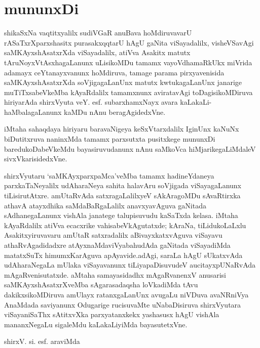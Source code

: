 \chapter*{mununxDi}
\vskip -20pt


shikaSxNa vaqtitxyalilx sudiVGaR anuBava hoMdiruvavarU rASaTxrXparxshasitx purasakxqqtarU hAgU gaNita viSayadalilx, visheVSavAgi saMKAyxshAsatxrXda viSayadalilx, atiVva Asakitx matutx tAruNoyxVtAsxhagaLanunx uLisikoMDu tamamx vayoVdhamaRkUkx  miVrida adamayx ceYtanayxvanunx hoMdiruva, tamage parama pirxyavenisida saMKAyxshAsatxrXda soVjigagaLanUnx matutx  kwtukagaLanUnx janarige muTiTxsabeVkeMba  kAyaRdalilx tamamxnunx aviratavAgi toDagisikoMDiruva hiriyarAda shirxVyuta veY. esf. subarxhamxNayx avara kaLakaLi-haMbalagaLanunx kaMDu nAnu beragAgidedxVne.

iMtaha  sahaqdaya hiriyaru baravaNigeya keSxVtarxdalilx IginUnx kaNuNx biDutitxruva naninxMda tamamx  parxsutxta pusitxkege mununxDi baredukoDabeVkeMdu bayasiruvudanunx nAnu saMkoVca hiMjarikegaLiMdaleV sivxVkarisidedxVne.

shirxVyutaru `saMKAyxparxpaMca'veMba tamamx hadineYdaneya parxkaTaNeyalilx udA\break haraNeya sahita halavAru soVjigada viSayagaLanunx tiLisirutAtxre. amUtaRvAda satxragaLalilxyeV  sAkAragoMDu sAvaRtirxka athavA atayxdhika saMdaBaRgaLalilx anavxya\break vAguva gaNitada  sAdhanegaLanunx vishAla janatege talupisuvudu kaSaTxda kelasa. iMtaha kAyaR\-dalilx  atiVva ecacxrike  vahisabeVkAgutatxde; kAraNa, tiLidukoLaLxlu Asakitxyiruva\-varu amUtaR satxradalilx aBivayxkatxvAguva viSayavu athaRvAgadidadxre atAyxnaMda\break viVyabahudAda gaNitada viSayadiMda  matatxSuTx himumxKarAguva apAyavide.\break adAgi, saraLa hAgU sUkatxvAda udAharaNegaLa mUlaka viSayavanunx tiLiya\break paDisuvudeV aucitayxpUNaRvAda mAgaRvenisutatxde. aMtaha samayasidadhx  mAgaR\break vanenxV anusarisi saMKAyxshAsatxrXveMba sAgarasadaqsha  loVkadiMda  tAvu dakikxsikoMDiruva amUlayx ratanxgaLanUnx  avugaLu niVDuva avaNRniVya AnaMdada saviyanunx Odugarige rucisuvaMte  uNabaDisiruva  shirxVyutara viSayaniSaThx  sAtitxvXka  parxyatanxkekx yashasusx  hAgU vishAla mananxNegaLu sigaleMdu kaLakaLiyiMda bayasutetxVne.
\begin{flushright}
 shirxV. si. esf. araviMda
\end{flushright}
